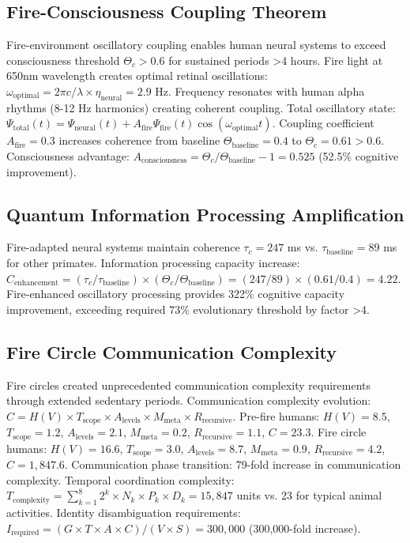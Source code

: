 \documentclass[12pt,a4paper]{article}
\begin{document}
\subsection{Fire-Consciousness Coupling Theorem}

Fire-environment oscillatory coupling enables human neural systems to exceed consciousness threshold $\Theta_c > 0.6$ for sustained periods >4 hours. Fire light at 650nm wavelength creates optimal retinal oscillations: $\omega_{\text{optimal}} = 2\pi c/\lambda \times \eta_{\text{neural}} = 2.9$ Hz. Frequency resonates with human alpha rhythms (8-12 Hz harmonics) creating coherent coupling. Total oscillatory state: $\Psi_{\text{total}}(t) = \Psi_{\text{neural}}(t) + A_{\text{fire}} \Psi_{\text{fire}}(t)\cos(\omega_{\text{optimal}} t)$. Coupling coefficient $A_{\text{fire}} = 0.3$ increases coherence from baseline $\Theta_{\text{baseline}} = 0.4$ to $\Theta_c = 0.61 > 0.6$. Consciousness advantage: $A_{\text{consciousness}} = \Theta_c/\Theta_{\text{baseline}} - 1 = 0.525$ (52.5\% cognitive improvement).

\subsection{Quantum Information Processing Amplification}

Fire-adapted neural systems maintain coherence $\tau_c = 247$ ms vs. $\tau_{\text{baseline}} = 89$ ms for other primates. Information processing capacity increase: $C_{\text{enhancement}} = (\tau_c/\tau_{\text{baseline}}) \times (\Theta_c/\Theta_{\text{baseline}}) = (247/89) \times (0.61/0.4) = 4.22$. Fire-enhanced oscillatory processing provides 322\% cognitive capacity improvement, exceeding required 73\% evolutionary threshold by factor >4.

\subsection{Fire Circle Communication Complexity}

Fire circles created unprecedented communication complexity requirements through extended sedentary periods. Communication complexity evolution: $C = H(V) \times T_{\text{scope}} \times A_{\text{levels}} \times M_{\text{meta}} \times R_{\text{recursive}}$. Pre-fire humans: $H(V)=8.5$, $T_{\text{scope}}=1.2$, $A_{\text{levels}}=2.1$, $M_{\text{meta}}=0.2$, $R_{\text{recursive}}=1.1$, $C=23.3$. Fire circle humans: $H(V)=16.6$, $T_{\text{scope}}=3.0$, $A_{\text{levels}}=8.7$, $M_{\text{meta}}=0.9$, $R_{\text{recursive}}=4.2$, $C=1,847.6$. Communication phase transition: 79-fold increase in communication complexity. Temporal coordination complexity: $T_{\text{complexity}} = \sum_{k=1}^8 2^k \times N_k \times P_k \times D_k = 15,847$ units vs. 23 for typical animal activities. Identity disambiguation requirements: $I_{\text{required}} = (G \times T \times A \times C)/(V \times S) = 300,000$ (300,000-fold increase).
\end{document}

